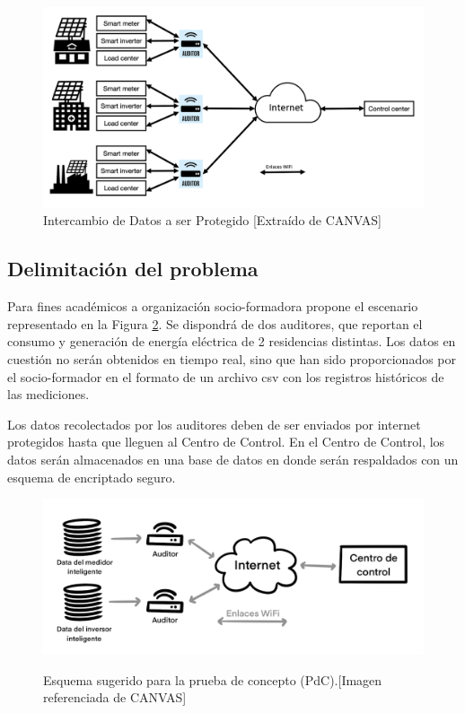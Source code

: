\documentclass{article}
\begin{document}
            \begin{figure}[htbp]
                \centering
                \includegraphics[scale=0.30]{img/dataExchange.png}
                \caption{Intercambio de Datos a ser Protegido [Extraído de CANVAS]}
                \label{fig:dataExchange}
            \end{figure}

        \subsection{Delimitación del problema}

            Para fines académicos a organización socio-formadora propone el escenario representado en la Figura \ref{fig:esquema}. Se dispondrá de dos auditores, que reportan el consumo y generación de energía eléctrica de 2 residencias distintas. Los datos en cuestión no serán obtenidos en tiempo real, sino que han sido proporcionados por el socio-formador en el formato de un archivo csv con los registros históricos de las mediciones.

            Los datos recolectados por los auditores deben de ser enviados por internet protegidos hasta que lleguen al Centro de Control. En el Centro de Control, los datos serán almacenados en una base de datos en donde serán respaldados con un esquema de encriptado seguro.

            \begin{figure}[h]
                \centering
                \includegraphics[scale=0.35]{img/esquema_reto.png}\\
                \caption{Esquema sugerido para la prueba de concepto (PdC).[Imagen referenciada de CANVAS]}
                \label{fig:esquema}
            \end{figure}
\end{document}
